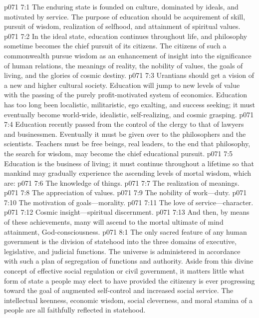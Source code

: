 \vs p071 7:1 The enduring state is founded on culture, dominated by ideals, and motivated by service. The purpose of education should be acquirement of skill, pursuit of wisdom, realization of selfhood, and attainment of spiritual values.
\vs p071 7:2 In the ideal state, education continues throughout life, and philosophy sometime becomes the chief pursuit of its citizens. The citizens of such a commonwealth pursue wisdom as an enhancement of insight into the significance of human relations, the meanings of reality, the nobility of values, the goals of living, and the glories of cosmic destiny.
\vs p071 7:3 Urantians should get a vision of a new and higher cultural society. Education will jump to new levels of value with the passing of the purely profit\hyp{}motivated system of economics. Education has too long been localistic, militaristic, ego exalting, and success seeking; it must eventually become world\hyp{}wide, idealistic, self\hyp{}realizing, and cosmic grasping.
\vs p071 7:4 Education recently passed from the control of the clergy to that of lawyers and businessmen. Eventually it must be given over to the philosophers and the scientists. Teachers must be free beings, real leaders, to the end that philosophy, the search for wisdom, may become the chief educational pursuit.\plusone
\vs p071 7:5 Education is the business of living; it must continue throughout a lifetime so that mankind may gradually experience the ascending levels of mortal wisdom, which are:
\pc \vs p071 7:6 \bibnobreakspace The knowledge of things.
\vs p071 7:7 \bibnobreakspace The realization of meanings.
\vs p071 7:8 \bibnobreakspace The appreciation of values.
\vs p071 7:9 \bibnobreakspace The nobility of work---duty.
\vs p071 7:10 \bibnobreakspace The motivation of goals---morality.
\vs p071 7:11 \bibnobreakspace The love of service---character.
\vs p071 7:12 \bibnobreakspace Cosmic insight---spiritual discernment.
\pc \vs p071 7:13 And then, by means of these achievements, many will ascend to the mortal ultimate of mind attainment, God\hyp{}consciousness.
\vs p071 8:1 The only sacred feature of any human government is the division of statehood into the three domains of executive, legislative, and judicial functions. The universe is administered in accordance with such a plan of segregation of functions and authority. Aside from this divine concept of effective social regulation or civil government, it matters little what form of state a people may elect to have provided the citizenry is ever progressing toward the goal of augmented self\hyp{}control and increased social service. The intellectual keenness, economic wisdom, social cleverness, and moral stamina of a people are all faithfully reflected in statehood.\plusone
